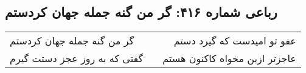 \begin{center}
\section*{رباعی شماره ۴۱۶: گر من گنه جمله جهان کردستم}
\label{sec:sh416}
\begin{longtable}{l p{0.5cm} r}
گر من گنه جمله جهان کردستم
&&
عفو تو امیدست که گیرد دستم
\\
گفتی که به روز عجز دستت گیرم
&&
عاجزتر ازین مخواه کاکنون هستم
\\
\end{longtable}
\end{center}

